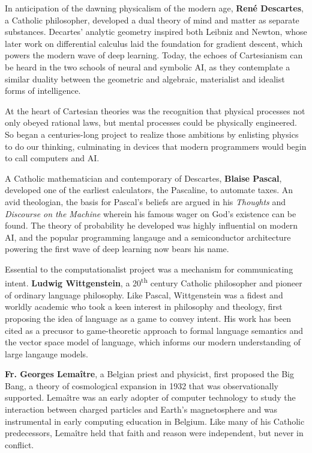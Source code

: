 \documentclass[sigplan,nonacm]{acmart}\settopmatter{printfolios=false,printccs=false,printacmref=false}
\begin{document}
  In anticipation of the dawning physicalism of the modern age, \textbf{Ren\'e Descartes}, a Catholic philosopher, developed a dual theory of mind and matter as separate substances. Decartes' analytic geometry inspired both Leibniz and Newton, whose later work on differential calculus laid the foundation for gradient descent, which powers the modern wave of deep learning. Today, the echoes of Cartesianism can be heard in the two schools of neural and symbolic AI, as they contemplate a similar duality between the geometric and algebraic, materialist and idealist forms of intelligence.

  At the heart of Cartesian theories was the recognition that physical processes not only obeyed rational laws, but mental processes could be physically engineered. So began a centuries-long project to realize those ambitions by enlisting physics to do our thinking, culminating in devices that modern programmers would begin to call computers and AI.

  A Catholic mathematician and contemporary of Descartes, \textbf{Blaise Pascal}, developed one of the earliest calculators, the Pascaline, to automate taxes. An avid theologian, the basis for Pascal's beliefs are argued in his \textit{Thoughts} and \textit{Discourse on the Machine} wherein his famous wager on God's existence can be found. The theory of probability he developed was highly influential on modern AI, and the popular programming langauge and a semiconductor architecture powering the first wave of deep learning now bears his name.

  Essential to the computationalist project was a mechanism for communicating intent. \textbf{Ludwig Wittgenstein}, a 20\textsuperscript{th} century Catholic philosopher and pioneer of ordinary language philosophy. Like Pascal, Wittgenstein was a fidest and worldly academic who took a keen interest in philosophy and theology, first proposing the idea of language as a game to convey intent. His work has been cited as a precusor to game-theoretic approach to formal language semantics and the vector space model of language, which informs our modern understanding of large langauge models.

  \textbf{Fr. Georges Lema\^itre}, a Belgian priest and physicist, first proposed the Big Bang, a theory of cosmological expansion in 1932 that was observationally supported. Lema\^itre was an early adopter of computer technology to study the interaction between charged particles and Earth's magnetosphere and was instrumental in early computing education in Belgium. Like many of his Catholic predecessors, Lema\^itre held that faith and reason were independent, but never in conflict.
\end{document}
